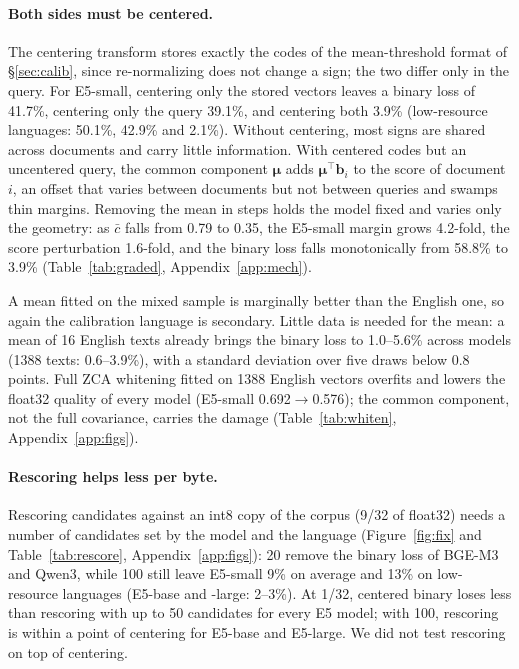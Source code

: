 \documentclass[11pt]{article}
\newcommand{\vmu}{\boldsymbol{\mu}}
\begin{document}
\paragraph{Both sides must be centered.} The centering transform stores exactly the codes of the mean-threshold format of \S\ref{sec:calib}, since re-normalizing does not change a sign; the two differ only in the query. For E5-small, centering only the stored vectors leaves a binary loss of 41.7\%, centering only the query 39.1\%, and centering both 3.9\% (low-resource languages: 50.1\%, 42.9\% and 2.1\%). Without centering, most signs are shared across documents and carry little information. With centered codes but an uncentered query, the common component $\vmu$ adds $\vmu^\top\mathbf{b}_i$ to the score of document $i$, an offset that varies between documents but not between queries and swamps thin margins. Removing the mean in steps holds the model fixed and varies only the geometry: as $\bar c$ falls from 0.79 to 0.35, the E5-small margin grows 4.2-fold, the score perturbation 1.6-fold, and the binary loss falls monotonically from 58.8\% to 3.9\% (Table~\ref{tab:graded}, Appendix~\ref{app:mech}).

 A mean fitted on the mixed sample is marginally better than the English one, so again the calibration language is secondary. Little data is needed for the mean: a mean of 16 English texts already brings the binary loss to 1.0--5.6\% across models (1388 texts: 0.6--3.9\%), with a standard deviation over five draws below 0.8 points. Full ZCA whitening fitted on 1388 English vectors overfits and lowers the float32 quality of every model (E5-small 0.692$\to$0.576); the common component, not the full covariance, carries the damage (Table~\ref{tab:whiten}, Appendix~\ref{app:figs}).

\paragraph{Rescoring helps less per byte.} Rescoring candidates against an int8 copy of the corpus (9/32 of float32) needs a number of candidates set by the model and the language (Figure~\ref{fig:fix} and Table~\ref{tab:rescore}, Appendix~\ref{app:figs}): 20 remove the binary loss of BGE-M3 and Qwen3, while 100 still leave E5-small 9\% on average and 13\% on low-resource languages (E5-base and -large: 2--3\%). At 1/32, centered binary loses less than rescoring with up to 50 candidates for every E5 model; with 100, rescoring is within a point of centering for E5-base and E5-large. We did not test rescoring on top of centering.
\end{document}

